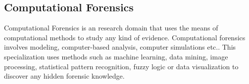 \subsection{Computational Forensics} Computational Forensics is an research domain that uses the means of computational methods to study any kind of evidence. Computational forensics involves modeling, computer-based \nohyphens{analysis,} computer simulations etc.. This specialization uses methods such as machine learning, data mining, image processing, statistical pattern recognition, fuzzy logic or data visualization to discover any hidden forensic knowledge. 

%
%
%
%
%
%
%
%
%
%
%
%		
%
%
%
%
%
%



